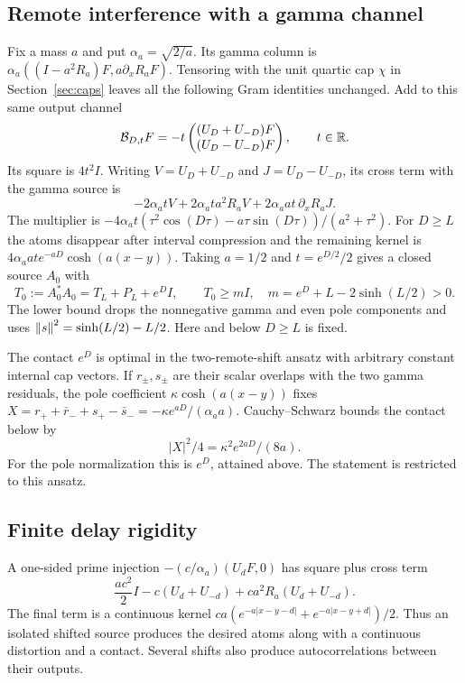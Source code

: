\subsection{Remote interference with a gamma channel}
Fix a mass $a$ and put $\alpha_a=\sqrt{2/a}$. Its gamma column is
$\alpha_a((I-a^2R_a)F,a\partial_xR_aF)$.
Tensoring with the unit quartic cap $\chi$ in
Section~\ref{sec:caps} leaves all the following Gram identities
unchanged. Add to this same output channel
\[
\mathcal B_{D,t}F=-t
\begin{pmatrix}(U_D+U_{-D})F\\(U_D-U_{-D})F\end{pmatrix},
\qquad t\in\mathbb R.
\]
Its square is $4t^2I$. Writing $V=U_D+U_{-D}$ and
$J=U_D-U_{-D}$, its cross term with the gamma source is
\[
-2\alpha_atV+2\alpha_at a^2R_aV
                   +2\alpha_a at\,\partial_xR_aJ.
\]
The multiplier is
$-4\alpha_at(\tau^2\cos(D\tau)-a\tau\sin(D\tau))/(a^2+\tau^2)$.
For $D\ge L$ the atoms disappear after interval compression and
the remaining kernel is
$4\alpha_a at e^{-aD}\cosh(a(x-y))$.
Taking $a=1/2$ and $t=e^{D/2}/2$ gives a closed source $A_0$ with
\begin{equation}\label{poles:delay-source}
T_0:=A_0^*A_0=T_L+P_L+e^D I,\qquad
T_0\ge mI,\quad m=e^D+L-2\sinh(L/2)>0.
\end{equation}
The lower bound drops the nonnegative gamma and even pole
components and uses $\left\lVert s\right\rVert^2=\sinh(L/2)-L/2$.
Here and below $D\ge L$ is fixed.

The contact $e^D$ is optimal in the two-remote-shift ansatz with
arbitrary constant internal cap vectors. If $r_\pm,s_\pm$ are
their scalar overlaps with the two gamma residuals, the pole
coefficient $\kappa\cosh(a(x-y))$ fixes
$X=r_++\bar r_-+s_+-\bar s_-=-\kappa e^{aD}/(\alpha_a a)$.
Cauchy--Schwarz bounds the contact below by
\[
|X|^2/4=\kappa^2e^{2aD}/(8a).
\]
For the pole normalization this is $e^D$, attained above.
The statement is restricted to this ansatz.

\subsection{Finite delay rigidity}
A one-sided prime injection
$-(c/\alpha_a)(U_dF,0)$ has square plus cross term
\[
\frac{ac^2}{2}I-c(U_d+U_{-d})
                   +ca^2R_a(U_d+U_{-d}).
\]
The final term is a continuous kernel
$ca(e^{-a|x-y-d|}+e^{-a|x-y+d|})/2$.
Thus an isolated shifted source produces the desired atoms along
with a continuous distortion and a contact. Several shifts also
produce autocorrelations between their outputs.


